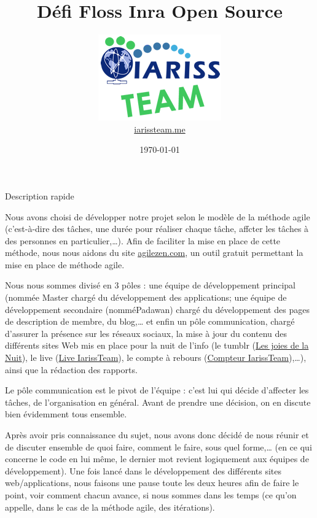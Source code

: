 \documentclass[12pt, a4paper]{article}
\title{Défi Floss Inra Open Source}
\newcommand{\espace}{\vspace{.8cm}}
\begin{document}
\author{\includegraphics{../_img/iariss_team.png} \\ {\sffamily \href{http://iarissteam.me}{iarissteam.me}}}
\date{\today}

\maketitle{}

{\sffamily Description rapide} 

\espace{}
Nous avons choisi de développer notre projet selon le modèle de la méthode agile (c'est-à-dire des tâches, une durée pour réaliser chaque tâche, affcter les tâches à des personnes en particulier,\ldots{}). Afin de faciliter la mise en place de cette méthode, nous nous aidons du site \href{http://www.agilezen.com/}{agilezen.com}, un outil gratuit permettant la mise en place de méthode agile.

Nous nous sommes divisé en 3 pôles : une équipe de développement principal (nommée \og{}Master\fg{} chargé du développement des applications; une équipe de développement secondaire (nommé\og{}Padawan\fg{}) chargé du développement des pages de description de membre, du blog,\ldots{} et enfin un pôle communication, chargé d'assurer la présence sur les réseaux sociaux, la mise à jour du contenu des différents sites Web mis en place pour la nuit de l'info (le tumblr (\href{http://lesjoiesdelanuit.tumblr.com/}{Les joies de la Nuit}), le live (\href{http://live.iarissteam.me/}{Live IarissTeam}), le compte à rebours (\href{http://iarissteam.me/}{Compteur IarissTeam}),\ldots{}), ainsi que la rédaction des rapports.

Le pôle communication est le pivot de l'équipe : c'est lui qui décide d'affecter les tâches, de l'organisation en général. Avant de prendre une décision, on en discute bien évidemment tous ensemble.

Après avoir pris connaissance du sujet, nous avons donc décidé de nous réunir et de discuter ensemble de quoi faire, comment le faire, sous quel forme,\ldots{} (en ce qui concerne le code en lui même, le dernier mot revient logiquement aux équipes de développement). Une fois lancé dans le développement des différents sites web/applications, nous faisons une pause toute les deux heures afin de faire le point, voir comment chacun avance, si nous sommes dans les temps (ce qu'on appelle, dans le cas de la méthode agile, des \og{}itérations\fg{}).
\end{document}
